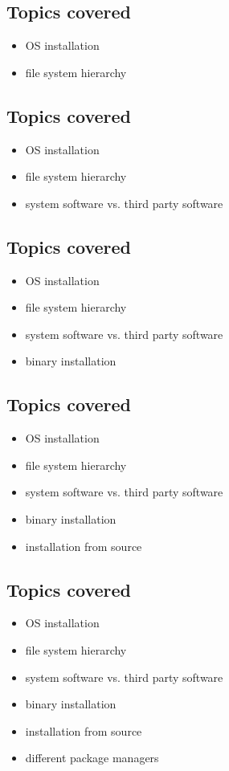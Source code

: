 \documentclass[xga]{xdvislides}
\begin{document}
\subsection{Topics covered}
\begin{itemize}
	\item OS installation
	\item file system hierarchy
\end{itemize}

\subsection{Topics covered}
\begin{itemize}
	\item OS installation
	\item file system hierarchy
	\item system software vs. third party software
\end{itemize}

\subsection{Topics covered}
\begin{itemize}
	\item OS installation
	\item file system hierarchy
	\item system software vs. third party software
	\item binary installation
\end{itemize}

\subsection{Topics covered}
\begin{itemize}
	\item OS installation
	\item file system hierarchy
	\item system software vs. third party software
	\item binary installation
	\item installation from source
\end{itemize}


\subsection{Topics covered}
\begin{itemize}
	\item OS installation
	\item file system hierarchy
	\item system software vs. third party software
	\item binary installation
	\item installation from source
	\item different package managers
\end{itemize}
\end{document}
